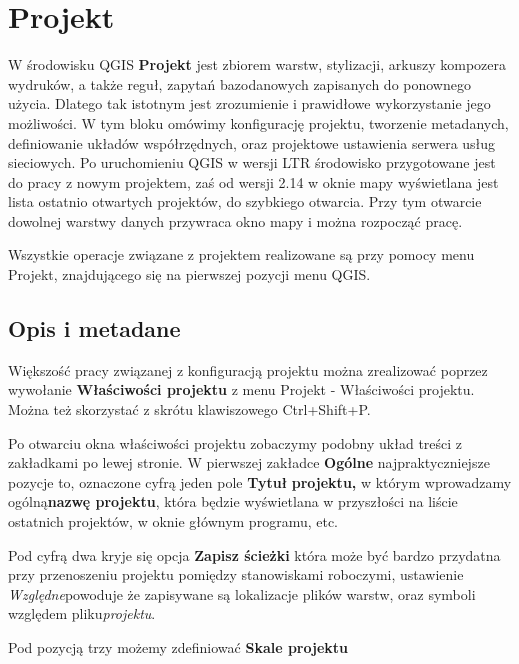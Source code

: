 \documentclass[12pt,a4paper]{book}
\begin{document}
\section{Projekt}
W środowisku QGIS \textbf{Projekt }jest zbiorem warstw, stylizacji, arkuszy kompozera wydruków, a także reguł, zapytań bazodanowych zapisanych do ponownego użycia. Dlatego tak istotnym jest zrozumienie i prawidłowe wykorzystanie jego możliwości. W tym bloku omówimy konfigurację projektu, tworzenie metadanych, definiowanie układów współrzędnych, oraz projektowe ustawienia serwera usług sieciowych.
Po uruchomieniu QGIS w wersji LTR środowisko przygotowane jest do pracy z nowym projektem, zaś od wersji 2.14 w oknie mapy wyświetlana jest lista ostatnio otwartych projektów, do szybkiego otwarcia. Przy tym otwarcie dowolnej warstwy danych przywraca okno mapy i można rozpocząć pracę.

Wszystkie operacje związane z projektem realizowane są przy pomocy menu Projekt, znajdującego się na pierwszej pozycji menu QGIS.

\subsection{Opis i metadane}
Większość pracy związanej z konfiguracją projektu można zrealizować poprzez wywołanie \textbf{Właściwości projektu} z menu Projekt - Właściwości projektu. Można też skorzystać z skrótu klawiszowego Ctrl+Shift+P.

Po otwarciu okna właściwości projektu zobaczymy podobny układ treści z zakładkami po lewej stronie. W pierwszej zakładce \textbf{Ogólne }najpraktyczniejsze pozycje to, oznaczone cyfrą jeden pole \textbf{Tytuł} \textbf{projektu, }w którym wprowadzamy ogólną\textbf{nazwę projektu}, która będzie wyświetlana w przyszłości na liście ostatnich projektów, w oknie głównym programu, etc.

Pod cyfrą dwa kryje się opcja \textbf{Zapisz ścieżki} która może być bardzo przydatna przy przenoszeniu projektu pomiędzy stanowiskami roboczymi, ustawienie \textit{Względne}powoduje że zapisywane są lokalizacje plików warstw, oraz symboli względem pliku\textit{projektu}.

Pod pozycją trzy możemy zdefiniować \textbf{Skale projektu}
\end{document}
